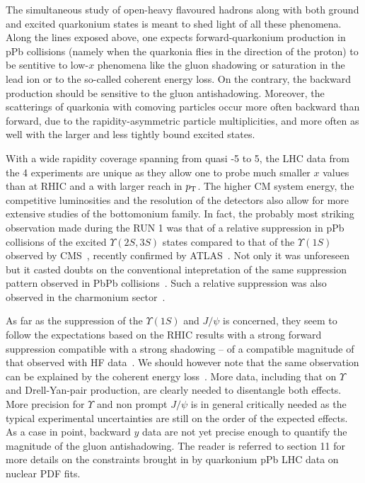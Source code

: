 \documentclass[../report.tex]{subfiles}
\begin{document}
The simultaneous study of open-heavy flavoured hadrons along with both ground and excited quarkonium states is meant to shed light of all these phenomena. Along the lines exposed above, one expects forward-quarkonium production in pPb collisions (namely when the quarkonia flies in the direction of the proton) to be sentitive to low-$x$ phenomena like the gluon shadowing or saturation in the lead ion or to the so-called coherent energy loss. On the contrary, the backward production should be sensitive to the gluon antishadowing. Moreover, the scatterings of quarkonia with comoving particles occur more often backward than forward, due to the rapidity-asymmetric particle multiplicities, and more often as well with the larger and less tightly bound excited states. 
   
With a wide rapidity coverage spanning from quasi -5 to 5, the LHC data from the 4 experiments are unique as they allow one to probe much smaller $x$ values than at RHIC and a with larger reach in $p\sb{\scriptstyle\mathrm{T}}$. The higher CM system energy, the competitive luminosities and the resolution of the detectors also allow for more extensive studies of the bottomonium family. In fact, the probably most striking observation made during the RUN 1 was that of a relative suppression in pPb collisions of the excited $\Upsilon(2S,3S)$ states compared to that of the $\Upsilon(1S)$ observed by CMS~\cite{Chatrchyan:2013nza}, recently confirmed by ATLAS~\cite{Aaboud:2017cif}. Not only it was unforeseen but it casted doubts on the conventional intepretation of the same suppression pattern observed in PbPb collisions~\cite{Chatrchyan:2012lxa}. Such a relative suppression was also observed in the charmonium sector~\cite{Abelev:2014zpa}.

As far as the suppression of the $\Upsilon(1S)$ and $J/\psi$ is concerned, they seem to follow the expectations based on the RHIC results with a strong forward suppression compatible with a strong shadowing -- of a compatible magnitude of that observed with HF data~\cite{Kusina:2017gkz}. We should however note that the same observation can be explained by the coherent energy loss~\cite{Arleo:2010rb}. More data, including that on $\Upsilon$ and Drell-Yan-pair production, are clearly needed to disentangle both effects. More precision for $\Upsilon$ and non prompt $J/\psi$ is in general critically needed as the typical experimental uncertainties are still on the order of the expected effects. As a case in point, backward $y$ data are not yet precise enough to quantify the magnitude of the gluon antishadowing.  The reader is referred to section 11 for more details on the constraints brought in by quarkonium pPb LHC data on nuclear PDF fits.
\end{document}
